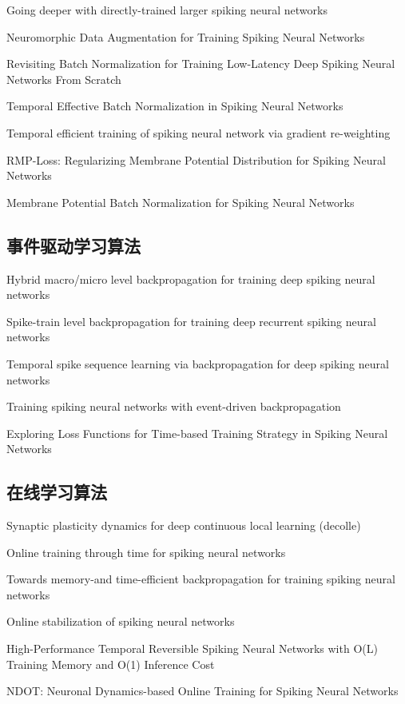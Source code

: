 \documentclass{SCIS2020cn}
\begin{document}
Going deeper with directly-trained larger spiking neural networks

Neuromorphic Data Augmentation for Training Spiking Neural Networks

Revisiting Batch Normalization for Training Low-Latency Deep Spiking Neural Networks From Scratch

Temporal Effective Batch Normalization in Spiking Neural Networks

Temporal efficient training of spiking neural network via gradient re-weighting

RMP-Loss: Regularizing Membrane Potential Distribution for Spiking Neural Networks

Membrane Potential Batch Normalization for Spiking Neural Networks


\subsection{事件驱动学习算法}%

Hybrid macro/micro level backpropagation for training deep spiking neural networks

Spike-train level backpropagation for training deep recurrent spiking neural networks

Temporal spike sequence learning via backpropagation for deep spiking neural networks

Training spiking neural networks with event-driven backpropagation

Exploring Loss Functions for Time-based Training Strategy in Spiking Neural Networks

\subsection{在线学习算法}%

Synaptic plasticity dynamics for deep continuous local learning (decolle)

Online training through time for spiking neural networks

Towards memory-and time-efficient backpropagation for training spiking neural networks

Online stabilization of spiking neural networks

High-Performance Temporal Reversible Spiking Neural Networks with O(L) Training Memory and O(1) Inference Cost

NDOT: Neuronal Dynamics-based Online Training for Spiking Neural Networks
\end{document}
